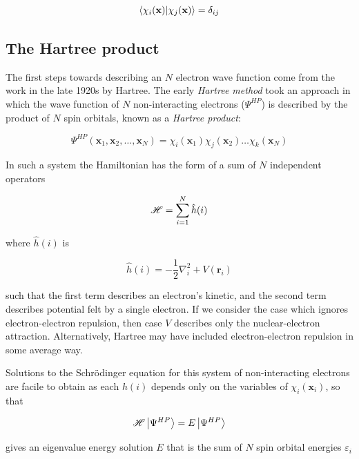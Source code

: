 \begin{equation}
\bra{\chi_i(\mathbf{x})}\ket{\chi_j(\mathbf{x})} = \delta_{ij}
\end{equation}

\subsection{The Hartree product}

The first steps towards describing an $N$ electron wave function come from the work in the late 1920s by Hartree. The early \emph{Hartree method} took an approach in which the wave function of $N$ non-interacting electrons ($\Psi^{HP}$) is described by the product of $N$ spin orbitals, known as a \emph{Hartree product}:

\begin{equation}
\Psi^{HP}(\mathbf{x}_1,\mathbf{x}_2,\ldots,\mathbf{x}_N) = \chi_i(\mathbf{x}_1)\chi_j(\mathbf{x}_2)\dots\chi_k(\mathbf{x}_N)
\end{equation}

\noindent In such a system the Hamiltonian has the form of a sum of $N$ independent operators

\begin{equation}
  \mathscr{H} = \sum_{i=1}^N \hat{h}(i)
\end{equation}

\noindent where $\hat{h}(i)$ is

\begin{equation}
  \hat{h}(i) = -\frac{1}{2} \nabla_i^2 + V(\mathbf{r}_i)
\end{equation}

\noindent such that the first term describes an electron's kinetic, and the second term describes potential felt by a single electron. If we consider the case which ignores electron-electron repulsion, then case $V$ describes only the nuclear-electron attraction. Alternatively, Hartree may have included electron-electron repulsion in some average way.

Solutions to the Schr{\"o}dinger equation for this system of non-interacting electrons are facile to obtain as each $h(i)$ depends only on the variables of $\chi_i(\mathbf{x}_i)$, so that

\begin{equation}
  \mathscr{H} \ket{\Psi^{HP}} = E \ket{\Psi^{HP}}
\end{equation}

\noindent gives an eigenvalue energy solution $E$ that is the sum of $N$ spin orbital energies $\varepsilon_i$

